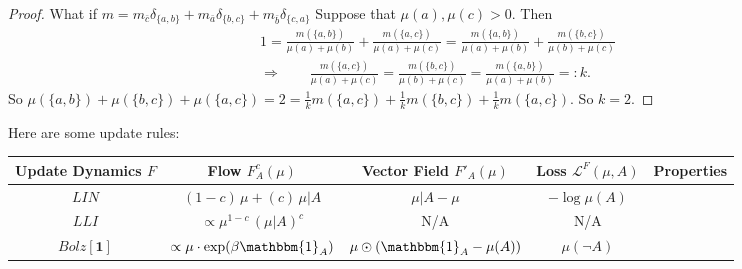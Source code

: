 \documentclass{article}
\begin{document}
\begin{proof}
    
    What if $m = m_{\bar c}\delta_{\{a,b\}} + m_{\bar a}\delta_{\{b,c\}} + m_{\bar b}\delta_{\{c,a\}}$
    Suppose that $\mu(a), \mu(c) > 0$. Then 
    \begin{align*}
         1 = \frac{m(\{a,b\})}{\mu(a) + \mu(b)} + \frac{m(\{a,c\})}{\mu(a) + \mu(c)} 
         = \frac{m(\{a,b\})}{\mu(a) + \mu(b)} + \frac{m(\{b,c\})}{\mu(b) + \mu(c)} \\
         \Rightarrow \qquad
         \frac{m(\{a,c\})}{\mu(a) + \mu(c)} = \frac{m(\{b,c\})}{\mu(b) + \mu(c)} = \frac{m(\{a,b\})}{\mu(a) + \mu(b)} =: k.
    \end{align*}
    So $\mu(\{a,b\}) + \mu(\{b,c\}) + \mu(\{a,c\}) = 2 = \frac{1}{k}m(\{a,c\}) + \frac1km(\{b,c\}) + \frac1k m(\{a,c\})$. So $k=2$.
        
\end{proof}

Here are some update rules:
\begin{center}
\begin{tabular}{c|ccc|c}\toprule
    Update Dynamics $F$ & Flow $F^c_A(\mu)$
        & Vector Field $F'_A(\mu)$
        & Loss $\mathcal L^{F}(\mu, A)$
        & Properties
        \\\midrule
    $\mathit{LIN}$
        & $%
            (1-c)\,\mu + (c)\,\mu| A$
        & $%
            \mu| A - \mu$
        & $%
            - \log \mu(A)$
        & \\ 
    $\mathit{LLI}$
        & $\propto
            \mu^{1-c}\, (\mu|A)^c$
        & {\color{red} N/A }
        & {\color{red} N/A }
        &\\
    $\mathit{Bolz}[\mathbf 1]$
        & $\propto
            \mu \cdot \exp( \beta \mathbbm{1}_A)$
        & $\mu \odot (\mathbbm{1}_A - \mu(A))$ 
        & $\mu(\lnot A)$
        & \\
    \bottomrule
\end{tabular}
\end{center}
\end{document}
